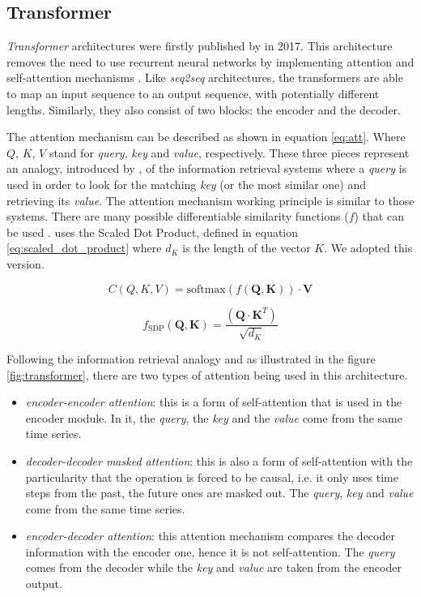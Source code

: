 \documentclass{elsarticle}
\begin{document}
   
	
	\subsection{Transformer}
	\textit{Transformer} architectures were firstly published by \cite{vaswani2017} in 2017. This architecture removes the need to use recurrent neural networks by implementing attention and self-attention mechanisms \cite{bahdanau2015}.  Like \textit{seq2seq} architectures, the transformers are able to map an input sequence to an output sequence, with potentially different lengths. Similarly, they also consist of two blocks: the encoder and the decoder.
	
	The attention mechanism can be described as shown in equation \ref{eq:att}. Where $Q$, $K$, $V$ stand for \textit{query}, \textit{key} and \textit{value}, respectively. These three pieces represent an analogy, introduced by \cite{vaswani2017}, of the information retrieval systems where a \textit{query} is used in order to look for the matching \textit{key} (or the most similar one) and retrieving its \textit{value}. The attention mechanism working principle is similar to those systems. There are many possible differentiable similarity functions ($f$) that can be used \cite{kamath2019}. \cite{vaswani2017} uses the Scaled Dot Product, defined in equation \ref{eq:scaled_dot_product} where $d_K$ is the length of the vector $K$. We adopted this version.
	
	\begin{equation}
	C(Q,K,V) = \text{softmax}(f(\mathbf{Q}, \mathbf{K})) \cdot \mathbf{V}
	\label{eq:att}
	\end{equation}
	
	\begin{equation}
	f_{\text{SDP}}(\mathbf{Q}, \mathbf{K}) = \frac{(\mathbf{Q} \cdot \mathbf{K}^T)} {\sqrt {d_K}}
	\label{eq:scaled_dot_product}
	\end{equation}
	
	Following the information retrieval analogy and as illustrated in the figure \ref{fig:transformer}, there are two types of attention being used in this architecture.
	\begin{itemize}
		\item \textit{encoder-encoder attention}: this is a form of self-attention that is used in the encoder module. In it, the \textit{query}, the \textit{key} and the \textit{value} come from the same time series.
		\item \textit{decoder-decoder masked attention}: this is also a form of self-attention with the particularity that the operation is forced to be causal, i.e. it only uses time steps from the past, the future ones are masked out. The \textit{query}, \textit{key} and \textit{value} come from the same time series.
		\item \textit{encoder-decoder attention}: this attention mechanism compares the decoder information with the encoder one, hence it is not self-attention. The \textit{query} comes from the decoder while the \textit{key} and \textit{value} are taken from the encoder output.
	\end{itemize}
	
\end{document}
